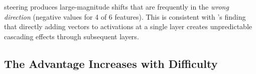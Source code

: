 \begin{table}[t]
    \centering
    \caption{Steering effectiveness comparison across methods. Values are mean activation shift (projected onto the target direction) $\pm$ standard error over 20 test texts. \textbf{Bold} indicates the best non-\caa method per feature. \ctadvantage is the difference between \ct and \prompting shifts.}
    \label{tab:main}
\end{table}

\caa steering produces large-magnitude shifts that are frequently in the \emph{wrong direction} (negative values for 4 of 6 features). This is consistent with \citet{braun2025unreliability}'s finding that directly adding vectors to activations at a single layer creates unpredictable cascading effects through subsequent layers.

\subsection{The Advantage Increases with Difficulty}
\label{sec:correlation}

